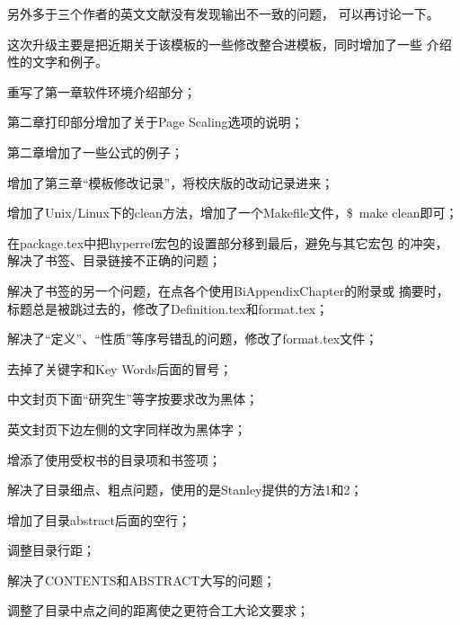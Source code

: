 另外多于三个作者的英文文献没有发现输出不一致的问题，
可以再讨论一下。

\label{Update:28.06.05}
这次升级主要是把近期关于该模板的一些修改整合进模板，同时增加了一些
介绍性的文字和例子。

\begin{hitlist}
\item 重写了第一章软件环境介绍部分；
\item 第二章打印部分增加了关于Page Scaling选项的说明；
\item 第二章增加了一些公式的例子；
\item 增加了第三章“模板修改记录”，将校庆版的改动记录进来；
\item 增加了Unix/Linux下的clean方法，增加了一个Makefile文件，\$~make clean即可；
\end{hitlist}

\begin{hitlist}
\item 在package.tex中把hyperref宏包的设置部分移到最后，避免与其它宏包
的冲突，解决了书签、目录链接不正确的问题；
\item 解决了书签的另一个问题，在点各个使用BiAppendixChapter的附录或
摘要时，标题总是被跳过去的，修改了Definition.tex和format.tex；
\item 解决了“定义”、“性质”等序号错乱的问题，修改了format.tex文件；
\item 去掉了关键字和Key Words后面的冒号；
\item 中文封页下面“研究生”等字按要求改为黑体；
\item 英文封页下边左侧的文字同样改为黑体字；
\item 增添了使用受权书的目录项和书签项；
\item 解决了目录细点、粗点问题，使用的是Stanley提供的方法1和2；
\item 增加了目录abstract后面的空行；
\item 调整目录行距；
\item 解决了CONTENTS和ABSTRACT大写的问题；
\item 调整了目录中点之间的距离使之更符合工大论文要求；
\end{hitlist}


